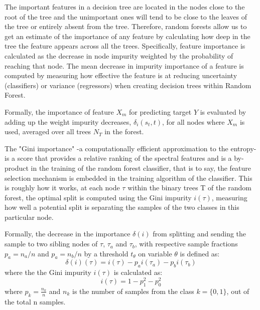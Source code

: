 \documentclass[preprint,12pt]{elsarticle}
\begin{document}
The important features in a decision tree are located in the nodes close to the root of the tree and the unimportant ones will tend to be close to the leaves of the tree or entirely absent from the tree. Therefore, random forests allow us to get an estimate of the importance of any feature by calculating how deep in the tree the feature appears across all the trees. 
Specifically, feature importance is calculated as the decrease in node impurity weighted by the probability of reaching that node. The mean decrease in impurity importance of a feature is computed by measuring how effective the feature is at reducing uncertainty (classifiers) or variance (regressors) when creating decision trees within Random Forest. 

Formally, the importance of feature $X_m$ for predicting target $Y$ is evaluated by adding up the weight impurity decreases, $\delta_i(s_t,t)$, for all nodes where $X_m$ is used, averaged over all trees $N_T$ in the forest.

The "Gini importance" -a computationally efficient approximation to the entropy- is a score that provides a relative ranking of the spectral features and is a by-product in the training of the random forest classifier, that is to say, the feature selection mechanism is embedded in the training algorithm of the classifier. 
This is roughly how it works, at each node $\tau$ within the binary trees T of the random forest, the optimal split is computed using the Gini impurity $i(\tau)$, measuring how well a potential split is separating the samples of the two classes in this particular node.

Formally, the decrease in the importance $\delta(i)$ from splitting and sending the sample to two sibling nodes of $\tau$, $\tau_a$ and $\tau_b$, with respective sample fractions $p_a=n_a/n$ and $p_a=n_b/n$ by a threshold $t_\theta$ on variable $\theta$ is defined as:
\begin{equation}
\delta(i)(\tau) = i(\tau) - p_{a}i(\tau_{a})- p_{b}i(\tau_{b})
\label{eq:delatiatu}
\end{equation}
where the the Gini impurity $i(\tau)$ is calculated as: 
\begin{equation}
i(\tau) = 1 -p_{1}^2 - p_{0}^2
\label{eq:iatu}
\end{equation}
where $p_k = \frac{n_k}{n}$ and $n_k$ is the number of samples from the class $k =\{0,1\}$, out of the total n samples.
\end{document}
